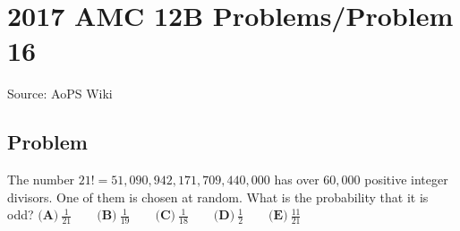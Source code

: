 \documentclass[12pt]{article}
\begin{document}
\section*{{2017 AMC 12B Problems/Problem 16}}
Source: AoPS Wiki

\subsection*{Problem}
The number $21!=51,090,942,171,709,440,000$ has over $60,000$ positive integer divisors. One of them is chosen at random. What is the probability that it is odd? $\textbf{(A)}\ \frac{1}{21} \qquad \textbf{(B)}\ \frac{1}{19} \qquad \textbf{(C)}\ \frac{1}{18} \qquad \textbf{(D)}\ \frac{1}{2} \qquad \textbf{(E)}\ \frac{11}{21}$
\end{document}
